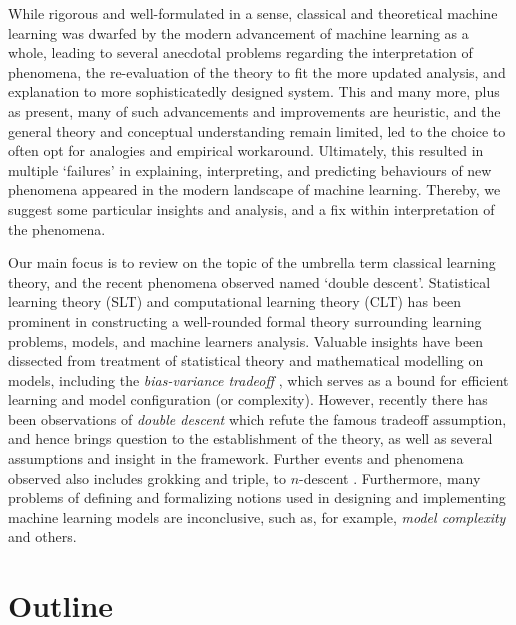 \documentclass[10pt]{article} %
\begin{document}
While rigorous and well-formulated in a sense, classical and theoretical machine learning was dwarfed by the modern advancement of machine learning as a whole, leading to several anecdotal problems regarding the interpretation of phenomena, the re-evaluation of the theory to fit the more updated analysis, and explanation to more sophisticatedly designed system. This and many more, plus as present, many of such advancements and improvements are heuristic, and the general theory and conceptual understanding remain limited, led to the choice to often opt for analogies and empirical workaround. Ultimately, this resulted in multiple `failures' in explaining, interpreting, and predicting behaviours of new phenomena appeared in the modern landscape of machine learning. Thereby, we suggest some particular insights and analysis, and a fix within interpretation of the phenomena. 

Our main focus is to review on the topic of the umbrella term classical learning theory, and the recent phenomena observed named `double descent'. Statistical learning theory (SLT) and computational learning theory (CLT) \cite{Vapnik1999-VAPTNO,10.5555/2371238,10.5555/2621980,STL_Hajek_Maxim_2021,bousquet2020theoryuniversallearning} has been prominent in constructing a well-rounded formal theory surrounding learning problems, models, and machine learners analysis. Valuable insights have been dissected from treatment of statistical theory and mathematical modelling on models, including the \textit{bias-variance tradeoff} \cite{6797087,Domingos2000AUB}, which serves as a bound for efficient learning and model configuration (or complexity). However, recently there has been observations of \textit{double descent} \cite{belkin_reconciling_2019,schaeffer_double_2023,nakkiran_deep_2019,lafon_understanding_2024} which refute the famous tradeoff assumption, and hence brings question to the establishment of the theory, as well as several assumptions and insight in the framework. Further events and phenomena observed also includes grokking and triple, to $n$-descent \cite{davies_unifying_2023,d_ascoli_triple_2020}. Furthermore, many problems of defining and formalizing notions used in designing and implementing machine learning models are inconclusive, such as, for example, \textit{model complexity} and others. 

\section{Outline}
\end{document}

